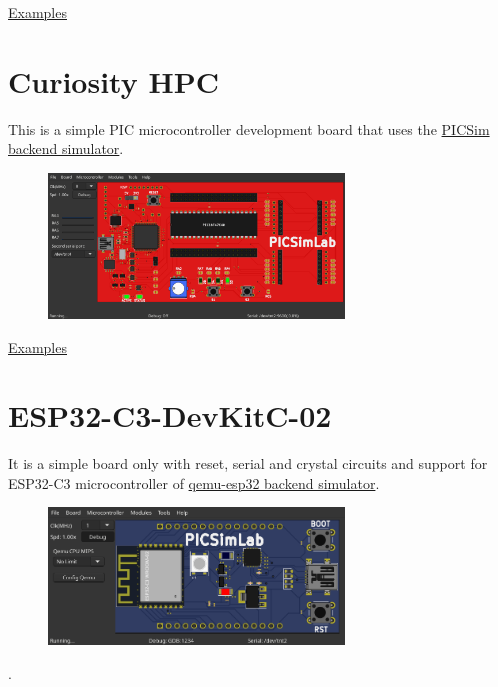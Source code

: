 \href{https://lcgamboa.github.io/picsimlab_examples/board_Curiosity.html}{Examples}

\section{Curiosity HPC}

This is a simple PIC microcontroller development board that uses the
\hyperlink{def:PICSim}{PICSim backend simulator}.

\begin{figure}[H]
\center
\includegraphics[width=0.7\textwidth]{img/Curiosity_HPC.png} 
\end{figure} 

\href{https://lcgamboa.github.io/picsimlab_examples/board_Curiosity_HPC.html}{Examples}

\section{ESP32-C3-DevKitC-02}

It is a simple board only with reset, serial and crystal circuits and support 
for ESP32-C3 microcontroller of \hyperlink{def:qemu-esp32}{qemu-esp32 backend simulator}.

\begin{figure}[H]
\center
\includegraphics[width=0.7\textwidth]{img/C3_DevKitC_02.png} 
\end{figure} 

.\vspace{0.5cm}

